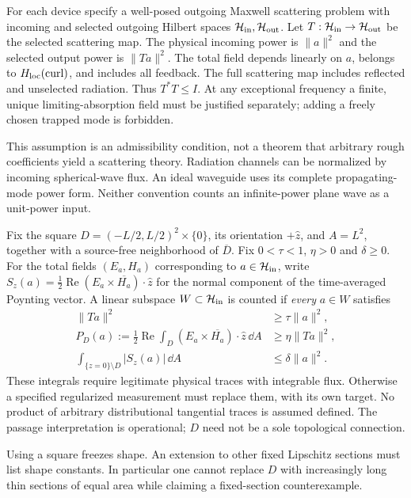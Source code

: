 \begin{assumption}\label{pr:scattering}
For each device specify a well-posed outgoing Maxwell scattering problem
with incoming and selected outgoing Hilbert spaces
$\mathcal H_{\rm in},\mathcal H_{\rm out}$. Let
$T:\mathcal H_{\rm in}\to\mathcal H_{\rm out}$ be the selected scattering
map. The physical incoming power is $\|a\|^2$ and the selected output
power is $\|Ta\|^2$. The total field depends linearly on $a$, belongs to
$H_{\rm loc}(\operatorname{curl})$, and includes all feedback. The full
scattering map includes reflected and unselected radiation. Thus
$T^*T\leq I$. At any exceptional frequency a finite, unique
limiting-absorption field must be justified separately; adding a freely
chosen trapped mode is forbidden.
\end{assumption}
This assumption is an admissibility condition, not a theorem that arbitrary rough coefficients yield a scattering theory. Radiation channels can be normalized by incoming spherical-wave flux. An ideal waveguide uses its complete propagating-mode power form. Neither convention counts an infinite-power plane wave as a unit-power input.

\begin{definition}\label{pr:count}
Fix the square $D=(-L/2,L/2)^2\times\{0\}$, its orientation $+\hat z$, and
$A=L^2$, together with a source-free neighborhood of $\overline D$.
Fix $0<\tau<1$, $\eta>0$ and $\delta\geq0$. For the total fields
$(E_a,H_a)$ corresponding to $a\in\mathcal H_{\rm in}$, write
$S_z(a)=\tfrac12\operatorname{Re}(E_a\times\overline{H_a})\cdot\hat z$
for the normal component of the time-averaged Poynting vector. A linear
subspace $W\subset\mathcal H_{\rm in}$ is counted if \emph{every}
$a\in W$ satisfies
\begin{align}
 \|Ta\|^2&\geq\tau\|a\|^2,\label{pr:transmission}\\
 P_D(a):=\tfrac12\operatorname{Re}\int_D(E_a\times\overline{H_a})\cdot\hat z\,\dd A
 &\geq\eta\|Ta\|^2,\label{pr:passage}\\
 \int_{\{z=0\}\setminus D}|S_z(a)|\,\dd A&\leq\delta\|a\|^2.\label{pr:bypass}
\end{align}
These integrals require legitimate physical traces with integrable flux. Otherwise a specified regularized measurement must replace them, with its own target. No product of arbitrary distributional tangential traces is assumed defined. The passage interpretation is operational; $D$ need not be a sole topological connection.
\end{definition}
Using a square freezes shape. An extension to other fixed Lipschitz sections must list shape constants. In particular one cannot replace $D$ with increasingly long thin sections of equal area while claiming a fixed-section counterexample.

